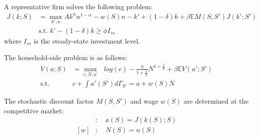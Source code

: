 A represntative firm solves the following problem:
\begin{align*}
  J(k;S) &= \max_{k',n} Ak^{\alpha}n^{1-\alpha} -w(S)n -k' + (1-\delta)k + \beta\mathbb{E}M(S,S')J(k';S')
  \\
  &\text{s.t. } k' - (1-\delta)k \geq \phi I_{ss}
\end{align*}
where $I_{ss}$ is the steady-state investment level.

The household-side problem is as follows:
\begin{align*}
  V(a;S) &= \max_{c,N,a'}\text{ } log(c) - \frac{\eta}{1+\frac{1}{\chi}} N^{1+\frac{1}{\chi}} + \beta \mathbb{E}V(a';S')
  \\
  \text{s.t.}\quad& c + \int a'(S') d\Gamma_{S'} =  a + w(S)N
\end{align*}

The stochastic discount factor $M(S,S')$ and wage $w(S)$ are determined at the competitive market:
\begin{align*}
  [M]&:\quad a(S) = J(k(S);S)
  \\
  [w]&:\quad N(S) = n(S)
\end{align*}

